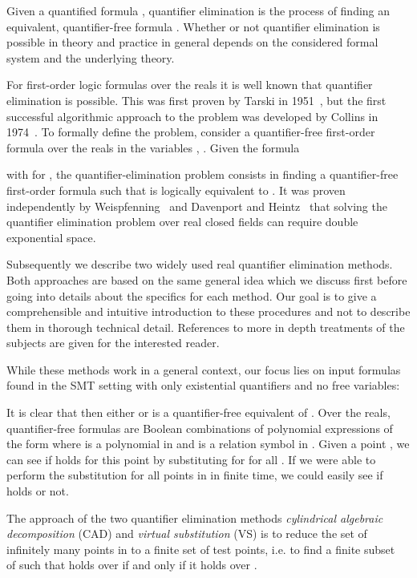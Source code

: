 \documentclass{llncs}
\begin{document}
Given a quantified formula , quantifier elimination is the
process of finding an equivalent, quantifier-free formula
. Whether or not quantifier elimination is possible in theory
and practice in general depends on the considered formal system and
the underlying theory.

For first-order logic formulas over the reals it is well known that quantifier
elimination is possible.  This was first proven by Tarski in 1951~\cite{tarski},
but the first successful algorithmic approach to the problem was developed by
Collins in 1974~\cite{collins}.  To formally define the problem, consider a
quantifier-free first-order formula  over
the reals in the variables , . Given the formula

with  for , the quantifier-elimination
problem consists in finding a quantifier-free first-order formula
 such that  is logically equivalent to .  It
was proven independently by Weispfenning~\cite{weispfenning2} and Davenport and
Heintz~\cite{davenport} that solving the quantifier elimination problem over
real closed fields can require double exponential space.

Subsequently we describe two widely used real quantifier elimination
methods. Both approaches are based on the same general idea which we
discuss first before going into details about the specifics for
each method. Our goal is to give a comprehensible and intuitive
introduction to these procedures and not to describe them in thorough
technical detail.  References to more in depth treatments of the
subjects are given for the interested reader.

While these methods work in a general context, our focus lies on input
formulas found in the SMT setting with only existential quantifiers
and no free variables:

It is clear that then either
 or  is a quantifier-free equivalent of
. Over the reals, quantifier-free formulas are Boolean
combinations of polynomial expressions of the form
 where  is a polynomial in
 and  is a relation symbol in
. Given a point , we can see if  holds for this point by substituting
 for  for all . If we were able to perform
the substitution for all points in  in finite time, we could
easily see if  holds or not.

The approach of the two quantifier elimination methods
\textit{cylindrical algebraic decomposition} (CAD) and \textit{virtual
  substitution} (VS) is to reduce the set of infinitely many points in
 to a finite set of test points, i.e. to find a finite
subset~ of  such that  holds over  if and only
if it holds over .
\end{document}
